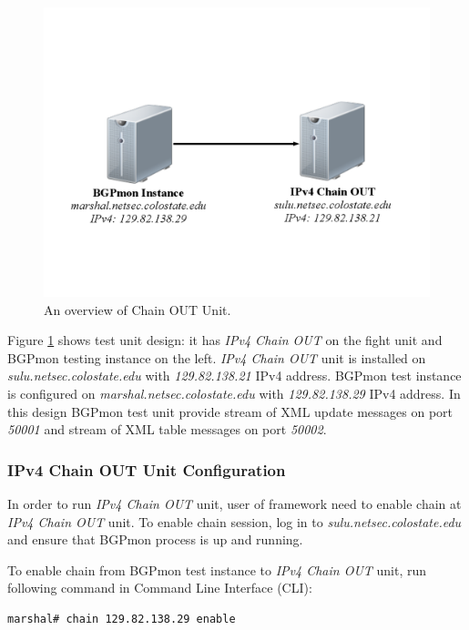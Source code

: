 \begin{figure}
\centering
\includegraphics[scale=0.30]{figs/ipv4-chain-out.png}
\caption{An overview of Chain OUT Unit.}
\label{chainout}
\end{figure}

Figure \ref{chainout} shows test unit design: it has \emph{IPv4 Chain OUT} on the fight unit and BGPmon testing instance on the left.  \emph{IPv4 Chain OUT} unit is installed on \emph{sulu.netsec.colostate.edu} with \emph{129.82.138.21} IPv4 address.  BGPmon test instance is configured on \emph{marshal.netsec.colostate.edu} with \emph{129.82.138.29} IPv4 address. In this design BGPmon test unit provide stream of XML update messages on port \emph{50001} and stream of XML table messages on port \emph{50002}.

\subsubsection{IPv4 Chain OUT Unit Configuration}

In order to run \emph{IPv4 Chain OUT} unit, user of framework need to enable chain  at \emph{IPv4 Chain OUT} unit. To enable chain session, log in to \emph{sulu.netsec.colostate.edu} and ensure that BGPmon process is up and running.  

To enable chain from  BGPmon test instance to \emph{IPv4 Chain OUT} unit, run following command in Command Line Interface (CLI):

\begin{verbatim}
marshal# chain 129.82.138.29 enable
\end{verbatim}

